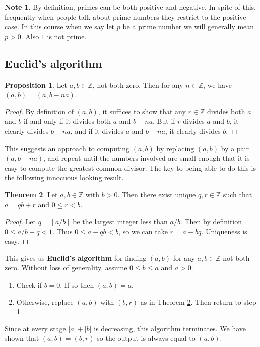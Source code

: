 \documentclass{article}
\newcommand{\Z}{\mathbb{Z}}
\newcommand{\rb}[1]{\left( #1 \right)}
\newcommand{\abs}[1]{\left\lvert #1 \right\rvert}
\newcommand{\fb}[1]{\left\lfloor #1 \right\rfloor}
\theoremstyle{definition}\newtheorem{definition}{Definition}
\theoremstyle{definition}\newtheorem{remark}[definition]{Remark}
\theoremstyle{definition}\newtheorem*{example}{Example}
\theoremstyle{definition}\newtheorem*{note}{Note}
\newtheorem{proposition}[definition]{Proposition}
\newtheorem{theorem}[definition]{Theorem}
\begin{document}
\begin{note}
By definition, primes can be both positive and negative. In spite of this, frequently when people talk about prime numbers they restrict to the positive case. In this course when we say let $ p $ be a prime number we will generally mean $ p > 0 $. Also $ 1 $ is not prime.
\end{note}

\subsection{Euclid's algorithm}

\begin{proposition}
Let $ a, b \in \Z $, not both zero. Then for any $ n \in \Z $, we have $ \rb{a, b} = \rb{a, b - na} $.
\end{proposition}

\begin{proof}
By definition of $ \rb{a, b} $, it suffices to show that any $ r \in \Z $ divides both $ a $ and $ b $ if and only if it divides both $ a $ and $ b - na $. But if $ r $ divides $ a $ and $ b $, it clearly divides $ b - na $, and if it divides $ a $ and $ b - na $, it clearly divides $ b $.
\end{proof}

This suggests an approach to computing $ \rb{a, b} $ by replacing $ \rb{a, b} $ by a pair $ \rb{a, b - na} $, and repeat until the numbers involved are small enough that it is easy to compute the greatest common divisor. The key to being able to do this is the following innocuous looking result.

\begin{theorem}
\label{thm:5}
Let $ a, b \in \Z $ with $ b > 0 $. Then there exist unique $ q, r \in \Z $ such that $ a = qb + r $ and $ 0 \le r < b $.
\end{theorem}

\begin{proof}
Let $ q = \fb{a / b} $ be the largest integer less than $ a / b $. Then by definition $ 0 \le a / b - q < 1 $. Thus $ 0 \le a - qb < b $, so we can take $ r = a - bq $. Uniqueness is easy.
\end{proof}

This gives us \textbf{Euclid's algorithm} for finding $ \rb{a, b} $ for any $ a, b \in \Z $ not both zero. Without loss of generality, assume $ 0 \le b \le a $ and $ a > 0 $.
\begin{enumerate}
\item Check if $ b = 0 $. If so then $ \rb{a, b} = a $.
\item Otherwise, replace $ \rb{a, b} $ with $ \rb{b, r} $ as in Theorem \ref{thm:5}. Then return to step 1.
\end{enumerate}
Since at every stage $ \abs{a} + \abs{b} $ is decreasing, this algorithm terminates. We have shown that $ \rb{a, b} = \rb{b, r} $ so the output is always equal to $ \rb{a, b} $.
\end{document}
